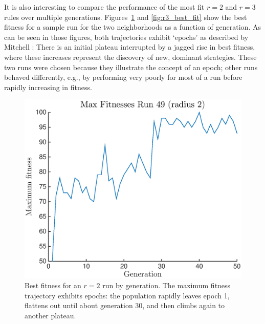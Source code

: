 It is also interesting to compare the performance of the most fit $r = 2$ and $r = 3$ rules over multiple generations. Figures~\ref{fig:r2_best_fit} and 
\ref{fig:r3_best_fit} show the best fitness for a sample run for the two neighborhoods as a function of generation. As can be seen in those figures, both trajectories exhibit `epochs' as described by Mitchell \cite{Mitchell:1994:ECA:186092.186116}: There is an initial plateau interrupted by a jagged rise in 
best fitness, where these increases represent the discovery of new, dominant strategies. These two runs were chosen because they illustrate the concept 
of an epoch; other runs behaved differently, e.g., by performing very poorly for most of a run before rapidly increasing in fitness.

\begin{figure}
\begin{center}
\includegraphics[width=\linewidth]{figures/max_epoch_radius2.eps}
\caption{Best fitness for an $r = 2$ run by generation. The maximum fitness trajectory exhibits epochs: the population rapidly leaves epoch 1, flattens out until about generation 30, and then climbs again to another plateau.}
\label{fig:r2_best_fit}
\end{center}
\end{figure}
